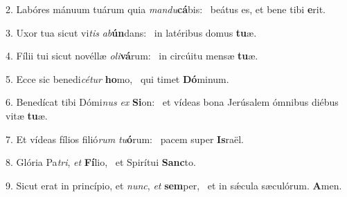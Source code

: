 2. Labóres mánuum tuárum quia \textit{man}\textit{du}\textbf{cá}bis: \ast\  beátus es, et bene tibi \textbf{e}rit.\

3. Uxor tua sicut vi\textit{tis} \textit{ab}\textbf{ún}dans: \ast\  in latéribus domus \textbf{tu}æ.\

4. Fílii tui sicut novéllæ \textit{o}\textit{li}\textbf{vá}rum: \ast\  in circúitu mensæ \textbf{tu}æ.\

5. Ecce sic benedi\textit{cé}\textit{tur} \textbf{ho}mo, \ast\  qui timet \textbf{Dó}minum.\

6. Benedícat tibi Dómi\textit{nus} \textit{ex} \textbf{Si}on: \ast\  et vídeas bona Jerúsalem ómnibus diébus vitæ \textbf{tu}æ.\

7. Et vídeas fílios filió\textit{rum} \textit{tu}\textbf{ó}rum: \ast\  pacem super \textbf{Is}raël.\

8. Glória Pa\textit{tri}, \textit{et} \textbf{Fí}lio, \ast\  et Spirítui \textbf{Sanc}to.\

9. Sicut erat in princípio, et \textit{nunc}, \textit{et} \textbf{sem}per, \ast\  et in sǽcula sæculórum. \textbf{A}men.\

